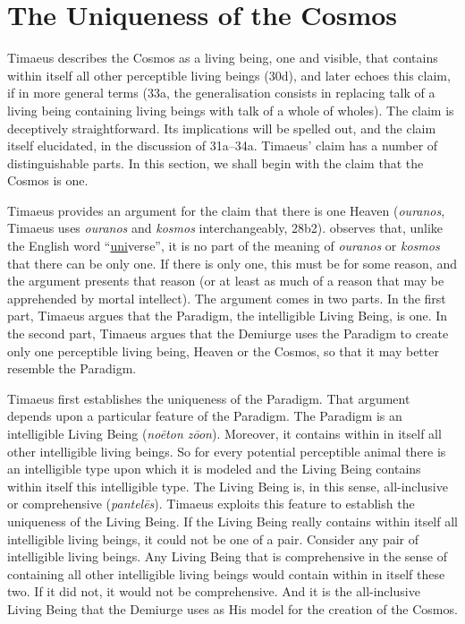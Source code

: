 
\section{The Uniqueness of the Cosmos} %
\label{sec:the_uniqueness_of_the_Cosmos}

Timaeus describes the Cosmos as a living being, one and visible, that contains within itself all other perceptible living beings (30d), and later echoes this claim, if in more general terms (33a, the generalisation consists in replacing talk of a living being containing living beings with talk of a whole of wholes). The claim is deceptively straightforward. Its implications will be spelled out, and the claim itself elucidated, in the discussion of 31a--34a. Timaeus' claim has a number of distinguishable parts. In this section, we shall begin with the claim that the Cosmos is one.

Timaeus provides an argument for the claim that there is one Heaven (\emph{ouranos}, Timaeus uses \emph{ouranos} and \emph{kosmos} interchangeably, 28b2). \citet[84]{Taylor:1928qb} observes that, unlike the English word ``\underline{uni}verse'', it is no part of the meaning of \emph{ouranos} or \emph{kosmos} that there can be only one. If there is only one, this must be for some reason, and the argument presents that reason (or at least as much of a reason that may be apprehended by mortal intellect). The argument comes in two parts. In the first part, Timaeus argues that the Paradigm, the intelligible Living Being, is one. In the second part, Timaeus argues that the Demiurge uses the Paradigm to create only one perceptible living being, Heaven or the Cosmos, so that it may better resemble the Paradigm.

Timaeus first establishes the uniqueness of the Paradigm. That argument depends upon a particular feature of the Paradigm. The Paradigm is an intelligible Living Being (\emph{noēton zōon}). Moreover, it contains within in itself all other intelligible living beings. So for every potential perceptible animal there is an intelligible type upon which it is modeled and the Living Being contains within itself this intelligible type. The Living Being is, in this sense, all-inclusive or comprehensive (\emph{pantelēs}). Timaeus exploits this feature to establish the uniqueness of the Living Being. If the Living Being really contains within itself all intelligible living beings, it could not be one of a pair. Consider any pair of intelligible living beings. Any Living Being that is comprehensive in the sense of containing all other intelligible living beings would contain within in itself these two. If it did not, it would not be comprehensive. And it is the all-inclusive Living Being that the Demiurge uses as His model for the creation of the Cosmos.

